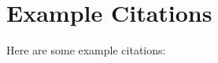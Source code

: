 \documentclass{article}
\begin{document}
\section*{Example Citations}

Here are some example citations:

\cite{Myers1973_vol_I, Myers1973_vol_II, Myers1973_vol_III, Myers1973_vol_IV_Part1, Myers1973_vol_IV_Part2, Myers1973_vol_V, Myers1973_vol_VI, Myers1973_vol_VII}

\printbibliography
\end{document}
